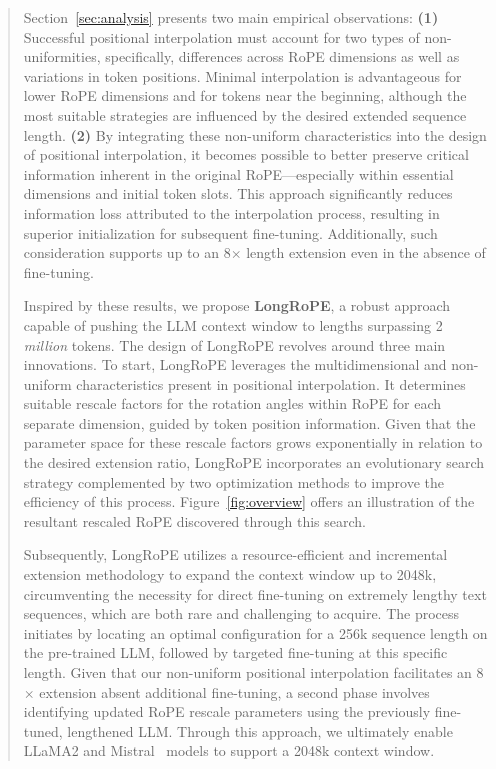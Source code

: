 \begin{abstract}
Section~\ref{sec:analysis} presents two main empirical observations: \textbf{(1)} Successful positional interpolation must account for two types of non-uniformities, specifically, differences across RoPE dimensions as well as variations in token positions. Minimal interpolation is advantageous for lower RoPE dimensions and for tokens near the beginning, although the most suitable strategies are influenced by the desired extended sequence length.
  \textbf{(2)} By integrating these non-uniform characteristics into the design of positional interpolation, it becomes possible to better preserve critical information inherent in the original RoPE—especially within essential dimensions and initial token slots. This approach significantly reduces information loss attributed to the interpolation process, resulting in superior initialization for subsequent fine-tuning. Additionally, such consideration supports up to an 8$\times$ length extension even in the absence of fine-tuning.

Inspired by these results, we propose \textbf{LongRoPE}, a robust approach capable of pushing the LLM context window to lengths surpassing 2 \emph{million} tokens. The design of LongRoPE revolves around three main innovations. To start, {LongRoPE} leverages the multidimensional and non-uniform characteristics present in positional interpolation. It determines suitable rescale factors for the rotation angles within RoPE for each separate dimension, guided by token position information. Given that the parameter space for these rescale factors grows exponentially in relation to the desired extension ratio, {LongRoPE} incorporates an evolutionary search strategy complemented by two optimization methods to improve the efficiency of this process. Figure~\ref{fig:overview} offers an illustration of the resultant rescaled RoPE discovered through this search.

Subsequently, {LongRoPE} utilizes a resource-efficient and incremental extension methodology to expand the context window up to 2048k, circumventing the necessity for direct fine-tuning on extremely lengthy text sequences, which are both rare and challenging to acquire. The process initiates by locating an optimal configuration for a 256k sequence length on the pre-trained LLM, followed by targeted fine-tuning at this specific length. Given that our non-uniform positional interpolation facilitates an 8$\times$ extension absent additional fine-tuning, a second phase involves identifying updated RoPE rescale parameters using the previously fine-tuned, lengthened LLM. Through this approach, we ultimately enable LLaMA2 and Mistral~\cite{mistral} models to support a 2048k context window.


\end{abstract}
